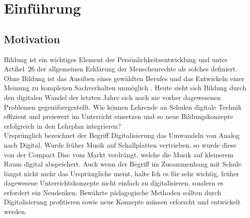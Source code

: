 \section{Einführung}\label{sec:einfuhrung}
\subsection{Motivation}\label{sec:motivation}
Bildung ist ein wichtiges Element der Persönlichkeitsentwicklung und unter Artikel~26 der allgemeinen Erklärung der Menschenrechte als solches definiert.  Ohne Bildung ist das Ausüben eines gewählten Berufes und das Entwickeln einer Meinung zu komplexen Sachverhalten unmöglich \cite{weitblicker.org2019:online}. Heute sieht sich Bildung durch den digitalen Wandel der letzten Jahre sich noch nie vorher dagewesenen Problemen gegenübergestellt. Wie können Lehrende an Schulen digitale Technik effizient und preiswert im Unterricht einsetzen und so neue Bildungskonzepte erfolgreich in den Lehrplan integrieren? \\ 

Ursprünglich bezeichnet der Begriff Digitalisierung das Umwandeln von Analog nach Digital. Wurde früher Musik auf Schallplatten vertrieben, so wurde diese von der Compact Disc vom Markt verdrängt, welche die Musik auf kleinerem Raum digital abspeichert. Auch wenn der Begriff im Zusammenhang mit Schule längst nicht mehr das Ursprüngliche meint, halte Ich es für sehr wichtig, früher dagewesene Unterrichtskonzepte nicht einfach zu digitalisieren, sondern es erfordert ein Neudenken. Bewährte pädagogische Methoden sollten durch Digitalisierung profitieren sowie neue Konzepte müssen erforscht und entwickelt werden. 

\newpage
